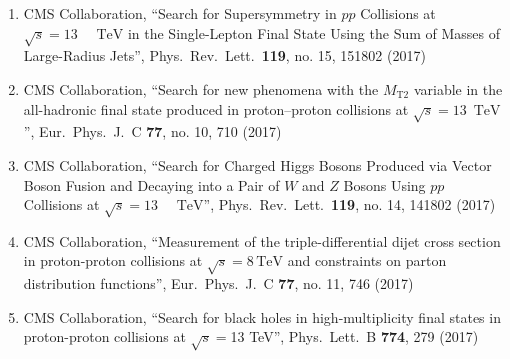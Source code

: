 \begin{enumerate}
\item CMS Collaboration, ``Search for Supersymmetry in $pp$ Collisions at $\sqrt{s}=13\text{ }\text{ }\mathrm{TeV}$ in the Single-Lepton Final State Using the Sum of Masses of Large-Radius Jets'', Phys.\ Rev.\ Lett.\  {\bf 119}, no. 15, 151802 (2017)

\item CMS Collaboration, ``Search for new phenomena with the $M_{\mathrm {T2}}$ variable in the all-hadronic final state produced in proton–proton collisions at $\sqrt{s} = 13$ $\,\text {TeV}$'', Eur.\ Phys.\ J.\ C {\bf 77}, no. 10, 710 (2017)

\item CMS Collaboration, ``Search for Charged Higgs Bosons Produced via Vector Boson Fusion and Decaying into a Pair of $W$ and $Z$ Bosons Using $pp$ Collisions at $\sqrt{s}=13\text{ }\text{ }\mathrm{TeV}$'', Phys.\ Rev.\ Lett.\  {\bf 119}, no. 14, 141802 (2017)

\item CMS Collaboration, ``Measurement of the triple-differential dijet cross section in proton-proton collisions at $\sqrt{s}=8\,\text {TeV} $ and constraints on parton distribution functions'', Eur.\ Phys.\ J.\ C {\bf 77}, no. 11, 746 (2017)

\item CMS Collaboration, ``Search for black holes in high-multiplicity final states in proton-proton collisions at $ \sqrt{s}=$13 TeV'', Phys.\ Lett.\ B {\bf 774}, 279 (2017)


\end{enumerate}
